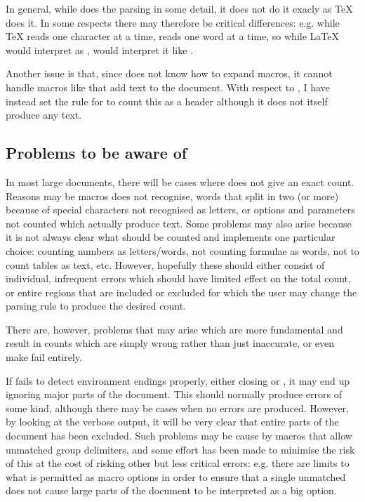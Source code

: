 \documentclass{article}
\begin{document}
In general, while \TeXcount{} does the parsing in some detail, it does not do it exacly as \TeX{} does it. In some respects there may therefore be critical differences: e.g. while \TeX{} reads one character at a time, \TeXcount{} reads one word at a time, so while \LaTeX{} would interpret  as , \TeXcount{} would interpret it like .

Another issue is that, since \TeXcount{} does not know how to expand macros, it cannot handle macros like  that add text to the document. With respect to , I have instead set the rule for  to count this as a header although it does not itself produce any text.


\subsection{Problems to be aware of}

In most large documents, there will be cases where \TeXcount{} does not give an exact count. Reasons may be macros \TeXcount{} does not recognise, words that \TeXcount{} split in two (or more) because of special characters not recognised as letters, or options and parameters not counted which actually produce text. Some problems may also arise because it is not always clear what should be counted and \TeXcount{} implements one particular choice: counting numbers as letters/words, not counting formulae as words, not to count tables as text, etc. However, hopefully these should either consist of individual, infrequent errors which should have limited effect on the total count, or entire regions that are included or excluded for which the user may change the parsing rule to produce the desired count.

There are, however, problems that may arise which are more fundamental and result in counts which are simply wrong rather than just inaccurate, or even make \TeXcount{} fail entirely.

If \TeXcount{} fails to detect environment endings properly, either closing \code{\{} or , it may end up ignoring major parts of the document. This should normally produce errors of some kind, although there may be cases when no errors are produced. However, by looking at the verbose output, it will be very clear that entire parts of the document has been excluded. Such problems may be cause by macros that allow unmatched group delimiters, and some effort has been made to minimise the risk of this at the cost of risking other but less critical errors: e.g. there are limits to what is permitted as macro options in order to ensure that a single unmatched \code{[} does not cause large parts of the document to be interpreted as a big option.
\end{document}
